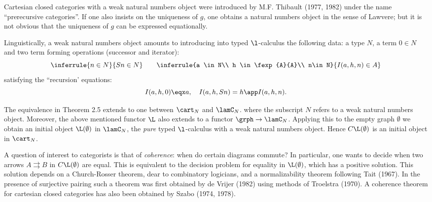 \begin{center}
\end{center}

Cartesian closed categories with a weak natural numbers object were introduced
by M.F. Thibault (1977, 1982) under the name ``prerecursive categories''. If
one also insists on the uniqueness of $g$, one obtains a natural numbers object
in the sense of Lawvere; but it is not obvious that the uniqueness of $g$ can
be expressed equationally.

Linguistically, a weak natural numbers object amounts to introducing into
typed $\l$-calculus the following data: a type $N$, a term $0 \in N$ and two term
forming operations (successor and iterator):
\[
\inferrule{n \in N}{Sn \in N} \qquad 
\inferrule{a \in N\\ h \in \fexp{A}{A}\\ n\in N}{I(a, h, n) \in A}
\]
satisfying the ``recursion' equations:
\[
I(a,h,0) \eqx a, \quad I(a,h,Sn) = h \app I(a,h,n) .
\]

The equivalence in Theorem 2.5 extends to one between
$\cart_N$ and $\lamC_N$.
where the subscript $N$ refers to a weak natural numbers object.
Moreover, the above mentioned functor $\L$ also extends to a functor
$\grph \to \lamC_N$. Applying this to the empty graph $\emptyset$
we obtain an initial object $\L(\emptyset)$ in $\lamC_N$, the {\em pure}
typed $\l$-calculus with a weak natural numbers object.
Hence $C\L(\emptyset)$ is an initial object in $\cart_N$.

A question of interest to categorists is that of {\em coherence}: when do
certain diagrams commute? In particular, one wants to decide when two arrows
$A \rightrightarrows B$ in $C\L(\emptyset)$ are equal.
This is equivalent to the decision problem for
equality in $\L(\emptyset)$, which has a positive solution. This solution depends on a
Church-Rosser theorem, dear to combinatory logicians, and a normalizability
theorem following Tait (1967). In the presence of surjective pairing such a
theorem was first obtained by de Vrijer (1982) using methods of Troelstra
(1970). A coherence theorem for cartesian closed categories has also been
obtained by Szabo (1974, 1978).

